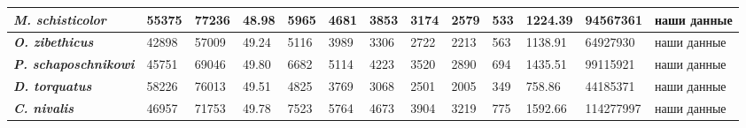\begin{landscape}
\begin{longtable}{|p{4.2cm}|p{1.5cm}|p{2.2cm}|p{1cm}|p{1cm}|p{1cm}|p{1cm}|p{1cm}|p{1cm}|p{1.5cm}|p{1.5cm}|p{2cm}|p{2.5cm}|}
				\textit{\textbf{M. schisticolor}} & 55375 & 77236 & 48.98 & 5965 & 4681 & 3853 & 3174 & 2579 & 533 & 1224.39 & 94567361 & наши данные \\ \hline
				\textit{\textbf{O. zibethicus}} & 42898 & 57009 & 49.24 & 5116 & 3989 & 3306 & 2722 & 2213 & 563 & 1138.91 & 64927930 & наши данные \\ \hline
				\textit{\textbf{P. schaposchnikowi}} & 45751 & 69046 & 49.80 & 6682 & 5114 & 4223 & 3520 & 2890 & 694 & 1435.51 & 99115921 & наши данные \\ \hline
				\textit{\textbf{D. torquatus}} & 58226 & 76013 & 49.51 & 4825 & 3769 & 3068 & 2501 & 2005 & 349 & 758.86 & 44185371 & наши данные \\ \hline
				\textit{\textbf{C. nivalis}} & 46957 & 71753 & 49.78 & 7523 & 5764 & 4673 & 3904 & 3219 & 775 & 1592.66 & 114277997 & наши данные \\ \hline		
\end{longtable}	

\end{landscape}

